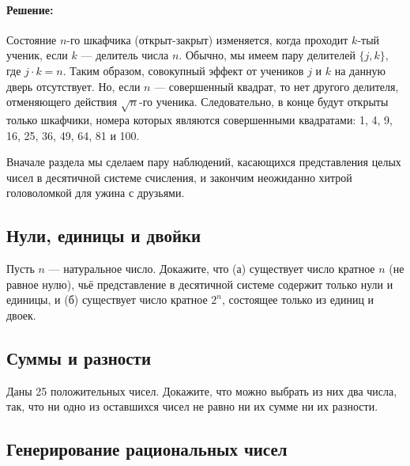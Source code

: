 \paragraph{Решение:}


Состояние $n$-го шкафчика (открыт-закрыт) изменяется, когда проходит $k$-тый ученик, если $k$ --- делитель числа $n$.
Обычно, мы имеем пару делителей $\{j,k\}$, где $j\cdot k=n$. 
Таким образом, совокупный эффект от учеников $j$ и $k$ на данную дверь отсутствует. %
Но, если $n$ --- совершенный квадрат, то нет другого делителя, отменяющего действия $\sqrt{n}$-го ученика. 
Следовательно, в конце будут открыты только шкафчики, номера которых являются совершенными квадратами: 1, 4, 9, 16, 25, 36, 49, 64, 81 и 100.\heart
 
Вначале раздела мы сделаем пару наблюдений, касающихся представления целых чисел в десятичной системе счисления, и закончим неожиданно хитрой головоломкой для ужина с друзьями. %




\subsection*{Нули, единицы и двойки}%


Пусть $n$ --- натуральное число. 
Докажите, что (а) существует число кратное $n$ (не равное нулю), чьё представление в десятичной системе содержит только нули и единицы, и
(б) существует число кратное $2^n$, состоящее только из единиц и двоек.






\subsection*{Суммы и разности} %


Даны 25 положительных чисел. 
Докажите, что можно выбрать из них два числа, так, что ни одно из оставшихся чисел не равно ни их сумме ни их разности.




\subsection*{Генерирование рациональных чисел}%


